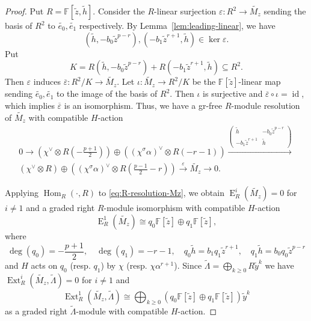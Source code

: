 \documentclass[11pt,a4paper]{article} %
\def\FF{\mathbb{F}}
\def\deg{\operatorname{deg}}
\def\E{\operatorname{E}}
\def\Ext{\operatorname{Ext}} %
\def\Hom{\operatorname{Hom}}
\def\id{\operatorname{id}}
\begin{document}
\begin{proof}
    Put $R=\FF[\widetilde{z},\widetilde{h}]$. Consider the $R$-linear surjection $\varepsilon:R^2\to\widetilde{M_z}$ sending the basis of $R^2$ to $\widetilde{e_0},\widetilde{e_1}$ respectively. By Lemma~\ref{lem:leading-linear}, we have 
    \[
    (\widetilde{h},-b_0\widetilde{z}^{p-r}),(-b_1\widetilde{z}^{r+1},\widetilde{h})\in\ker\varepsilon.
    \]
    Put 
    \[
    K=R(\widetilde{h},-b_0\widetilde{z}^{p-r})+R(-b_1\widetilde{z}^{r+1},\widetilde{h})\subseteq R^2.
    \]
    Then $\varepsilon$ induces $\overline{\varepsilon}:R^2/K\to\widetilde{M_z}$. Let $\iota:\widetilde{M_z}\to R^2/K$ be the $\FF[\widetilde{z}]$-linear map sending $\widetilde{e_0},\widetilde{e_1}$ to the image of the basis of $R^2$. Then $\iota$ is surjective and $\overline{\varepsilon}\circ\iota=\id$, which implies $\overline{\varepsilon}$ is an isomorphism. Thus, we have a gr-free $R$-module resolution of $\widetilde{M_z}$ with compatible $H$-action
    \begin{equation}\label{eq:R-resolution-Mz}
        \begin{split}
             0\longrightarrow\left(\chi^\vee\otimes R(-\frac{p+1}{2})\right)\oplus\left((\chi^\sigma\alpha)^\vee\otimes R(-r-1)\right)\xrightarrow{\left(\begin{smallmatrix} \widetilde{h} & -b_0\widetilde{z}^{p-r} \\ -b_1\widetilde{z}^{r+1} & \widetilde{h} \end{smallmatrix}\right)}\\
             (\chi^\vee\otimes R)\oplus\left((\chi^\sigma\alpha)^
            \vee\otimes R(\frac{p-1}{2}-r)\right)\xrightarrow{\,\varepsilon\,}\widetilde{M_z}\longrightarrow0.
        \end{split}
    \end{equation}

    Applying $\Hom_R(\cdot,R)$ to \eqref{eq:R-resolution-Mz}, we obtain $\E_R^i(\widetilde{M_z})=0$ for $i\ne1$ and a graded right $R$-module isomorphism with compatible $H$-action 
    \[
    \E_R^1(\widetilde{M_z})\cong q_0\FF[\widetilde{z}]\oplus q_1\FF[\widetilde{z}],
    \]
    where 
    \[
    \deg(q_0)=-\frac{p+1}{2},\quad\deg(q_1)=-r-1,\quad q_0\widetilde{h}=b_1q_1\widetilde{z}^{r+1},\quad q_1\widetilde{h}=b_0q_0\widetilde{z}^{p-r}
    \]
    and $H$ acts on $q_0$ (resp. $q_1$) by $\chi$ (resp. $\chi\alpha^{r+1}$). Since $\widetilde{\Lambda}=\bigoplus_{k\ge0}R\widetilde{y}^k$ we have $\Ext_R^i(\widetilde{M_z},\widetilde{\Lambda})=0$ for $i\ne1$ and 
    \[
    \Ext_R^1(\widetilde{M_z},\widetilde{\Lambda})\cong\bigoplus_{k\ge0}(q_0\FF[\widetilde{z}]\oplus q_1\FF[\widetilde{z}])\widetilde{y}^k
    \]
    as a graded right $\widetilde{\Lambda}$-module with compatible $H$-action.


\end{proof}
\end{document}
